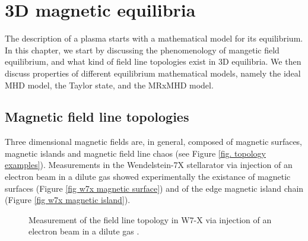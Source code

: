 \documentclass[my_thesis.tex]{subfiles}
\begin{document}
\chapter{3D magnetic equilibria}

The description of a plasma starts with a mathematical model for its equilibrium. In this chapter, we start by discussing the phenomenology of mangetic field equilibrium, and what kind of field line topologies exist in 3D equilibria. We then discuss properties of different equilibrium mathematical models, namely the ideal MHD model, the Taylor state, and the MRxMHD model.

\section{Magnetic field line topologies}
Three dimensional magnetic fields are, in general, composed of  magnetic surfaces, magnetic islands and magnetic field line chaos (see Figure \ref{fig. topology examples}). Measurements in the Wendelstein-7X stellarator via injection of an electron beam in a dilute gas \citep{pedersenConfirmationTopologyWendelstein2016} showed experimentally the existance of magnetic surfaces (Figure \ref{fig w7x magnetic surface}) and of the edge magnetic island chain (Figure \ref{fig w7x magnetic island}).

\begin{figure}%
	\centering
	\qquad
	\caption{Measurement of the field line topology in W7-X via injection of an electron beam in a dilute gas \citep{pedersenConfirmationTopologyWendelstein2016}.}
	\label{fig. w7x topology measurement}%
\end{figure}
\end{document}
